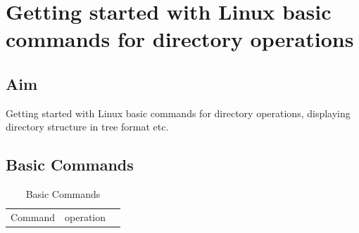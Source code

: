 \documentclass{article}
\begin{document}
\newpage
\section{Getting started with Linux basic commands for directory operations}

\subsection{Aim}
Getting started with Linux basic commands for directory operations, displaying directory structure in tree format etc.

\subsection{Basic Commands}
\begin{table}[htb]
\caption{Basic Commands}

\label{Basic commands in Linux}
\begin{tabular}{rcc}
\noalign{\smallskip} \hline \hline \noalign{\smallskip}
Command & operation \\


\end{tabular}
\end{table}
\end{document}
